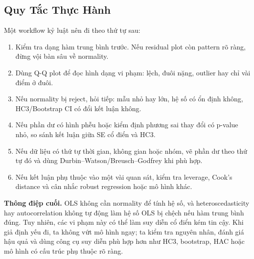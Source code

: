 \subsection*{Quy Tắc Thực Hành}

Một workflow kỷ luật nên đi theo thứ tự sau:

\begin{enumerate}
  \item Kiểm tra dạng hàm trung bình trước. Nếu residual plot còn pattern rõ ràng, đừng vội bàn sâu về normality.
  \item Dùng Q-Q plot để đọc hình dạng vi phạm: lệch, đuôi nặng, outlier hay chỉ vài điểm ở đuôi.
  \item Nếu normality bị reject, hỏi tiếp: mẫu nhỏ hay lớn, hệ số có ổn định không, HC3/Bootstrap CI có đổi kết luận không.
  \item Nếu phần dư có hình phễu hoặc kiểm định phương sai thay đổi có p-value nhỏ, so sánh kết luận giữa SE cổ điển và HC3.
  \item Nếu dữ liệu có thứ tự thời gian, không gian hoặc nhóm, vẽ phần dư theo thứ tự đó và dùng Durbin--Watson/Breusch--Godfrey khi phù hợp.
  \item Nếu kết luận phụ thuộc vào một vài quan sát, kiểm tra leverage, Cook's distance và cân nhắc robust regression hoặc mô hình khác.
\end{enumerate}

\begin{notebox}
\textbf{Thông điệp cuối.} OLS không cần normality để tính hệ số, và heteroscedasticity hay autocorrelation không tự động làm hệ số OLS bị chệch nếu hàm trung bình đúng. Tuy nhiên, các vi phạm này có thể làm suy diễn cổ điển kém tin cậy. Khi giả định yếu đi, ta không vứt mô hình ngay; ta kiểm tra nguyên nhân, đánh giá hậu quả và dùng công cụ suy diễn phù hợp hơn như HC3, bootstrap, HAC hoặc mô hình có cấu trúc phụ thuộc rõ ràng.
\end{notebox}

